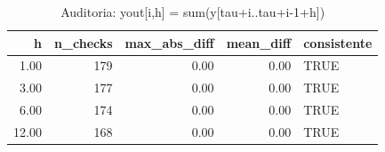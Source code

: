 \begin{table}[ht]
\centering
\begin{tabular}{rrrrl}
  \hline
h & n\_checks & max\_abs\_diff & mean\_diff & consistente \\ 
  \hline
1.00 & 179 & 0.00 & 0.00 & TRUE \\ 
  3.00 & 177 & 0.00 & 0.00 & TRUE \\ 
  6.00 & 174 & 0.00 & 0.00 & TRUE \\ 
  12.00 & 168 & 0.00 & 0.00 & TRUE \\ 
   \hline
\end{tabular}
\caption{Auditoria: yout[i,h] = sum(y[tau+i..tau+i-1+h])} 
\label{tab:audit_yout}
\end{table}
